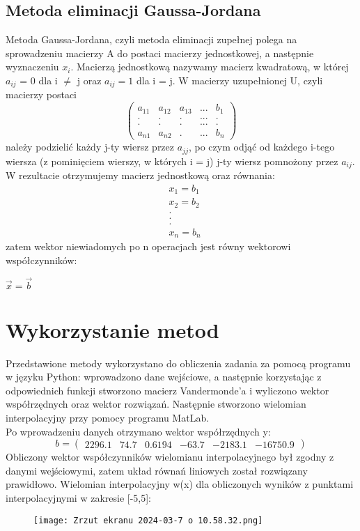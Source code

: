 \documentclass{article}
\begin{document}
\subsection{Metoda eliminacji Gaussa-Jordana}
Metoda Gaussa-Jordana, czyli metoda eliminacji zupełnej polega na sprowadzeniu macierzy A do postaci macierzy jednostkowej, a następnie wyznaczeniu $x_i$. Macierzą jednostkową nazywamy macierz kwadratową, w której $a_{ij}$ = 0 dla i $\not=$ j oraz $a_{ij} = 1$ dla i = j. W macierzy uzupełnionej U, czyli macierzy postaci
\[
\begin{pmatrix}
a_{11} & a_{12} & a_{13} & ... &  b_{1}\\
. & . & . &... & .\\
. & . & . & ... & .\\
a_{n1} & a_{n2} & . & ... & b_{n}
\end{pmatrix}
\]
należy podzielić każdy j-ty wiersz przez $a_{jj}$, po czym odjąć od każdego i-tego wiersza (z pominięciem wierszy, w których i = j) j-ty wiersz pomnożony przez $a_{ij}$. W rezultacie otrzymujemy macierz jednostkową oraz równania:
\begin{align*}
&x_1 = b_1\\
&x_2 = b_2\\
&.\\
&.\\
&.\\
&x_n = b_n
\end{align*}
zatem wektor niewiadomych po n operacjach jest równy wektorowi współczynników: 
\begin{center}
$\vec{x} = \vec{b}$
\end{center}
\newpage
\section{Wykorzystanie metod}
Przedstawione metody wykorzystano do obliczenia zadania  za pomocą programu w języku Python: wprowadzono dane wejściowe, a następnie korzystając z odpowiednich funkcji stworzono macierz Vandermonde'a i wyliczono wektor współrzędnych oraz wektor rozwiązań. Następnie stworzono wielomian interpolacyjny przy pomocy programu MatLab.\\
Po wprowadzeniu danych otrzymano wektor współrzędnych y:
\[ b = \begin{pmatrix} 2296.1 & 74.7 & 0.6194 & -63.7 & -2183.1 & -16750.9 \end{pmatrix} \]
Obliczony wektor współczynników wielomianu interpolacyjnego był zgodny z danymi wejściowymi, zatem układ równań liniowych został rozwiązany prawidłowo.
Wielomian interpolacyjny w(x) dla obliczonych wyników z punktami interpolacyjnymi w zakresie [-5,5]:
\begin{figure}[H]
    \centering
    \texttt{[image: Zrzut ekranu 2024-03-7 o 10.58.32.png]}
    \label{fig:enter-label}
\end{figure}
\newpage
\end{document}
